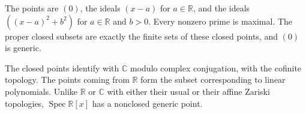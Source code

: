 The points are $(0)$, the ideals $(x-a)$ for $a\in\mathbb R$, and the ideals $((x-a)^2+b^2)$ for $a\in\mathbb R$ and $b>0$. Every nonzero prime is maximal. The proper closed subsets are exactly the finite sets of these closed points, and $(0)$ is generic.

The closed points identify with $\mathbb C$ modulo complex conjugation, with the cofinite topology. The points coming from $\mathbb R$ form the subset corresponding to linear polynomials. Unlike $\mathbb R$ or $\mathbb C$ with either their usual or their affine Zariski topologies, $\operatorname{Spec}\mathbb R[x]$ has a nonclosed generic point.
